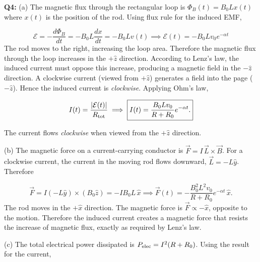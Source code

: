 \documentclass[a4paper,12pt]{article}
\begin{document}
\textbf{Q4:} (a) The magnetic flux through the rectangular loop is $\Phi_B(t)=B_0 Lx(t)$ where $x(t)$ is the position of the rod. Using flux rule for the induced EMF,

\[
\mathcal E
=
-\frac{d\Phi_B}{dt} =
-B_0L\frac{dx}{dt} = -B_0Lv(t) \implies \boxed{
\mathcal E(t)
=
-B_0Lv_0e^{-\alpha t}
}
\]
The rod moves to the right, increasing the loop area. Therefore the magnetic flux through the loop increases in the \(+\hat z\) direction. According to Lenz's law, the induced current must oppose this increase, producing a magnetic field in the \(-\hat z\) direction. A clockwise current (viewed from \(+\hat z\)) generates a field into the page (\(-\hat z\)). Hence the induced current is \emph{clockwise}. Applying Ohm's law,

\[
I(t)=\frac{|\mathcal E(t)|}{R_{\rm tot}} \implies  \boxed{
I(t)
=
\frac{B_0Lv_0}{R+R_0}
e^{-\alpha t}.
}
\]

The current flows \emph{clockwise} when viewed from the \(+\hat z\) direction.

(b) The magnetic force on a current-carrying conductor is $\vec F=I\,\vec L\times \vec B$. For a clockwise current, the current in the moving rod flows downward, $\vec L=-L\hat y$. Therefore

\[
\vec F
=
I(-L\hat y)\times(B_0\hat z)=-IB_0L\,\hat x \implies \boxed{
\vec F(t)
=
-\frac{B_0^2L^2v_0}{R+R_0}
e^{-\alpha t}\,\hat x.
}
\]
The rod moves in the \(+\hat x\) direction. The magnetic force is $\vec F \propto -\hat x$, opposite to the motion. Therefore the induced current creates a magnetic force that resists the increase of magnetic flux, exactly as required by Lenz's law.

(c) The total electrical power dissipated is $P_{\rm elec}=I^2(R+R_0)$. Using the result for the current,
\end{document}
